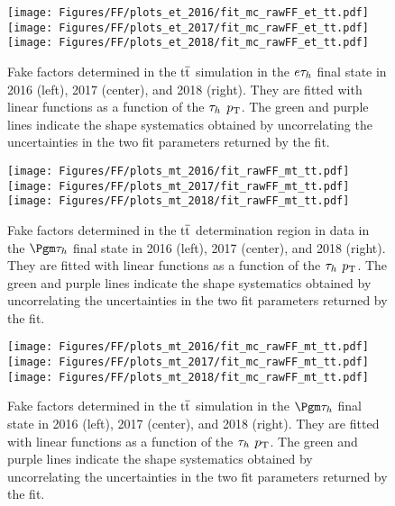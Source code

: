 \begin{figure}[ht!b]
\centering
\texttt{[image: Figures/FF/plots\_et\_2016/fit\_mc\_rawFF\_et\_tt.pdf]}
\texttt{[image: Figures/FF/plots\_et\_2017/fit\_mc\_rawFF\_et\_tt.pdf]}
\texttt{[image: Figures/FF/plots\_et\_2018/fit\_mc\_rawFF\_et\_tt.pdf]}\\
\caption{\label{fig:fit_raw_et_ttmc} Fake factors determined in the $\mathrm{t}\overline{\mathrm{t}}$ simulation in the $e\tau_h$ final state in 2016 (left), 2017 (center), and 2018 (right). They are fitted with linear functions as a function of the $\tau_h$ $p_{\mathrm{T}}$. The green and purple lines indicate the shape systematics obtained by uncorrelating the uncertainties in the two fit parameters returned by the fit.  }
\end{figure}

\begin{figure}[ht!b]
\centering
\texttt{[image: Figures/FF/plots\_mt\_2016/fit\_rawFF\_mt\_tt.pdf]}
\texttt{[image: Figures/FF/plots\_mt\_2017/fit\_rawFF\_mt\_tt.pdf]}
\texttt{[image: Figures/FF/plots\_mt\_2018/fit\_rawFF\_mt\_tt.pdf]}\\
\caption{\label{fig:fit_raw_mt_tt} Fake factors determined in the $\mathrm{t}\overline{\mathrm{t}}$ determination region in data in the $\Pgm\tauh$ final state in 2016 (left), 2017 (center), and 2018 (right). They are fitted with linear functions as a function of the $\tau_h$ $p_{\mathrm{T}}$. The green and purple lines indicate the shape systematics obtained by uncorrelating the uncertainties in the two fit parameters returned by the fit.  }
\end{figure}


\begin{figure}[ht!b]
\centering
\texttt{[image: Figures/FF/plots\_mt\_2016/fit\_mc\_rawFF\_mt\_tt.pdf]}
\texttt{[image: Figures/FF/plots\_mt\_2017/fit\_mc\_rawFF\_mt\_tt.pdf]}
\texttt{[image: Figures/FF/plots\_mt\_2018/fit\_mc\_rawFF\_mt\_tt.pdf]}\\
\caption{\label{fig:fit_raw_mt_ttmc} Fake factors determined in the $\mathrm{t}\overline{\mathrm{t}}$ simulation in the $\Pgm\tauh$ final state in 2016 (left), 2017 (center), and 2018 (right). They are fitted with linear functions as a function of the $\tau_h$ $p_{\mathrm{T}}$. The green and purple lines indicate the shape systematics obtained by uncorrelating the uncertainties in the two fit parameters returned by the fit.  }
\end{figure}
\clearpage
